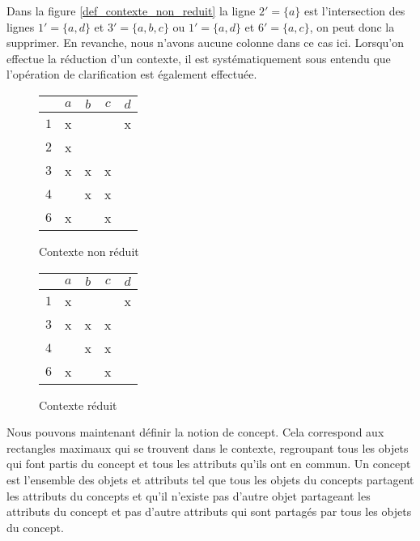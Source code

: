 Dans la figure \ref{def_contexte_non_reduit} la ligne $2' = \{a\}$ est l'intersection des lignes $1' = \{a, d\}$ et $3' = \{a, b, c\}$ ou $1' = \{a, d\}$ et $6' = \{a, c\}$, on peut donc la supprimer. En revanche, nous n'avons aucune colonne dans ce cas ici. Lorsqu'on effectue la réduction d'un contexte, il est systématiquement sous entendu que l'opération de clarification est également effectuée.

\begin{figure}[H]
	\begin{minipage}[c]{0.5\textwidth}
	\begin{center}
		\begin{tabular}{ l | c c c c }
			 & $a$ & $b$ & $c$ & $d$ \\
			\hline
			$1$ & x & & & x \\
			$2$ & x & & & \\
			$3$ & x & x & x & \\
			$4$ & & x & x & \\
			$6$ & x & & x & \\
		\end{tabular}
	\end{center}
	\caption{Contexte non réduit}
	\label{def_contexte_non_reduit}
	\end{minipage}
	\begin{minipage}[c]{0.5\textwidth}
	\begin{center}
		\begin{tabular}{ l | c c c c }
			 & $a$ & $b$ & $c$ & $d$ \\
			\hline
			$1$ & x & & & x \\
			$3$ & x & x & x & \\
			$4$ & & x & x & \\
			$6$ & x & & x & \\
		\end{tabular}
	\end{center}
	\caption{Contexte réduit}
	\label{def_contexte_reduit}
	\end{minipage}
\end{figure}

Nous pouvons maintenant définir la notion de concept. Cela correspond aux rectangles maximaux qui se trouvent dans le contexte, regroupant tous les objets qui font partis du concept et tous les attributs qu'ils ont en commun. Un concept est l'ensemble des objets et attributs tel que tous les objets du concepts partagent les attributs du concepts et qu'il n'existe pas d'autre objet partageant les attributs du concept et pas d'autre attributs qui sont partagés par tous les objets du concept.

